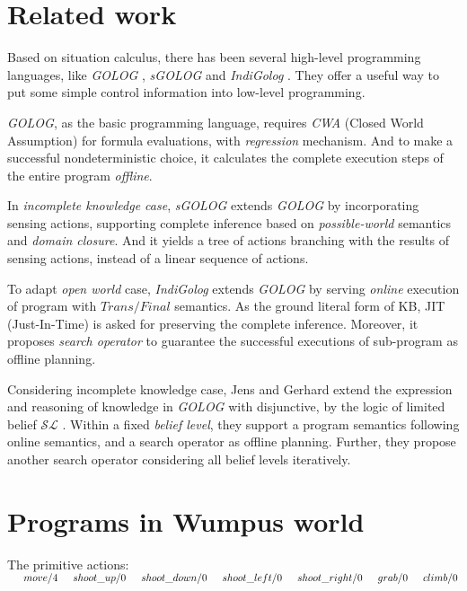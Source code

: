 \documentclass[letterpaper]{article}
\begin{document}
\section{Related work}

Based on situation calculus, there has been several high-level programming languages, like \emph{GOLOG} \cite{LRL97}, \emph{sGOLOG} \cite{Lak99} and \emph{IndiGolog} \cite{GLS01}. They offer a useful way to put some simple control information into low-level programming.

\emph{GOLOG}, as the basic programming language, requires \emph{CWA} (Closed World Assumption) for formula evaluations, with \emph{regression} mechanism. And to make a successful nondeterministic choice, it calculates the complete execution steps of the entire program \emph{offline}.

In \emph{incomplete knowledge case}, \emph{sGOLOG} extends \emph{GOLOG} by incorporating sensing actions, supporting complete inference based on \emph{possible-world} semantics and \emph{domain closure}. And it yields a tree of actions branching with the results of sensing actions, instead of a linear sequence of actions.

To adapt \emph{open world} case, \emph{IndiGolog} extends \emph{GOLOG} by serving \emph{online} execution of program with $Trans/Final$ semantics. As the ground literal form of KB, JIT (Just-In-Time) is asked for preserving the complete inference. Moreover, it proposes \emph{search operator} to guarantee the successful executions of sub-program as offline planning.

Considering incomplete knowledge case, Jens and Gerhard \cite{CL09} extend the expression and reasoning of knowledge in \emph{GOLOG} with disjunctive, by the logic of limited belief $\mathcal{SL}$ \cite{LLL04}. Within a fixed \emph{belief level},
they support a program semantics following online semantics, and a search operator as offline planning. Further, they propose another search operator considering all belief levels iteratively.
\section{Programs in Wumpus world}

The primitive actions:
\\
$\indent move/4\\
\indent shoot\_up/0\\
\indent shoot\_down/0\\
\indent shoot\_left/0\\
\indent shoot\_right/0\\
\indent grab/0\\
\indent climb/0$
\\
\end{document}
